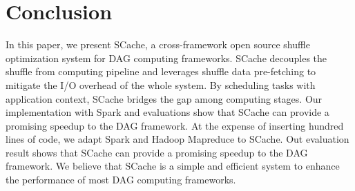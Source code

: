 \section{Conclusion}
 In this paper, we present SCache, a cross-framework open source shuffle optimization system for DAG computing frameworks. SCache decouples the shuffle from computing pipeline and leverages shuffle data pre-fetching to mitigate the I/O overhead of the whole system. By scheduling tasks with application context, SCache bridges the gap among computing stages. 
 {\color{red}
 Our implementation with Spark and evaluations show that SCache can provide a promising speedup to the DAG framework. 
 }
 {\color{blue}
 At the expense of inserting hundred lines of code, we adapt Spark and Hadoop Mapreduce to SCache. Out evaluation result shows that SCache can provide a promising speedup to the DAG framework.
 }
 We believe that SCache is a simple and efficient system to enhance the performance of most DAG computing frameworks. 